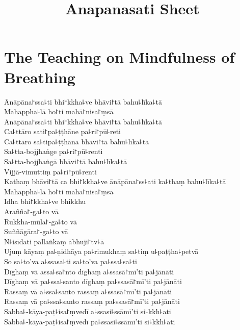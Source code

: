 \documentclass[
  babelLanguage=english,
  final,
  webversion,
]{chantingbook}
\title{Anapanasati Sheet}
\begin{document}
\mainmatter


\chapter{The Teaching on Mindfulness of Breathing}

\begin{leader}
\end{leader}

Ānāpāna꜓ssa꜕ti bhi꜓kkha꜕ve bhāvi꜓tā bahu꜕līka꜕tā\\
Mahappha꜕lā ho꜓ti mahā꜓nisa꜓ṃsā\\
Ānāpāna꜓ssa꜕ti bhi꜓kkha꜕ve bhāvi꜓tā bahu꜕līka꜕tā\\
Ca꜕ttāro sati꜓pa꜕ṭṭhāne pa꜕ri꜓pū꜕reti\\
Ca꜕ttāro sa꜕tipa꜕ṭṭhānā bhāvi꜓tā bahu꜕līka꜕tā\\
Sa꜕tta-bojjhaṅge pa꜕ri꜓pū꜕renti\\
Sa꜕tta-bojjhaṅgā bhāvi꜓tā bahu꜕līka꜕tā\\
Vijjā-vimuttiṃ pa꜕ri꜓pū꜕renti\\
Kathaṃ bhāvi꜓tā ca bhi꜓kkha꜕ve ānāpāna꜓ss꜕ati ka꜕thaṃ bahu꜕līka꜕tā\\
Mahappha꜕lā ho꜓ti mahā꜓nisa꜓ṃsā\\
Idha bhi꜓kkha꜕ve bhikkhu\\
Arañña꜓-ga꜕to vā\\
Rukkha-mūla꜓-ga꜕to vā\\
Suññāgāra꜓-ga꜕to vā\\
N꜕isīdati pallaṅkaṃ ābhuji꜓tv꜕ā\\
Ujuṃ kāyaṃ pa꜕ṇidhāya pa꜕rimukhaṃ sa꜕tiṃ u꜕paṭṭha꜕petvā\\
So sa꜕to'va a꜕ssasa꜕ti sa꜕to'va pa꜕ssa꜕sa꜕ti\\
Dīghaṃ vā assa꜕sa꜓nto dīghaṃ a꜕ssasā꜓mī'ti pa꜕jānāti\\
Dīghaṃ vā pa꜕ssa꜕santo dīghaṃ pa꜕ssasā꜓mī'ti pa꜕jānāti\\
Rassaṃ vā a꜕ssa꜕santo rassaṃ a꜕ssasā꜓mī'ti pa꜕jānāti\\
Rassaṃ vā pa꜕ssa꜕santo rassaṃ pa꜕ssasā꜓mī'ti pa꜕jānāti\\
Sabba꜕-kāya-paṭ꜕isa꜓ṃvedī a꜕ssasi꜕ssāmī'ti si꜕kkh꜕ati\\
Sabba꜕-kāya-paṭ꜕isa꜓ṃvedī pa꜕ssasi꜕ssāmī'ti si꜕kkh꜕ati

\clearpage

\enlargethispage{2\baselineskip}
\end{document}
